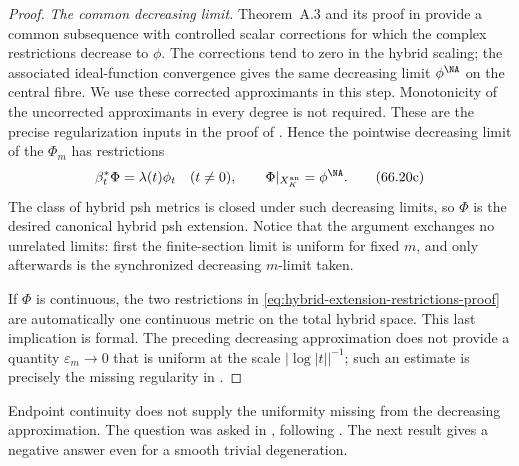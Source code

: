 \begin{proof}
\smallskip
\noindent\emph{The common decreasing limit.}
Theorem~A.3 and its proof in \cite{PS23Hybrid} provide a common subsequence
with controlled scalar corrections for which the complex restrictions
decrease to $\phi$. The corrections tend to zero in the hybrid scaling;
the associated ideal-function convergence gives the same decreasing limit
$\phi^{\NA}$ on the central fibre. We use these corrected approximants in
this step. Monotonicity of the uncorrected approximants in every degree is
not required. These are the precise regularization inputs in the proof of
\cite[Theorem~3.13]{PS23Hybrid}.  Hence the pointwise decreasing limit
of the $\Phi_m$ has restrictions
\[
        \beta_t^*\Phi=\lambda(t)\phi_t\quad(t\neq0),
        \qquad
        \Phi|_{X_K^{\mathrm{an}}}=\phi^{\NA}.
\tag{66.20c}\label{eq:hybrid-extension-restrictions-proof}
\]
The class of hybrid psh metrics is closed under such decreasing limits, so
$\Phi$ is the desired canonical hybrid psh extension.  Notice that the
argument exchanges no unrelated limits: first the finite-section limit is
uniform for fixed $m$, and only afterwards is the synchronized decreasing
$m$-limit taken.

If $\Phi$ is continuous, the two restrictions in
\eqref{eq:hybrid-extension-restrictions-proof} are automatically one
continuous metric on the total hybrid space.  This last implication is
formal.  The preceding decreasing approximation does not provide a
quantity $\varepsilon_m\to0$ that is uniform at the scale
$|\log|t||^{-1}$; such an estimate is precisely the missing regularity
in \cite[Question~3.18]{PS23Hybrid}.
\end{proof}

Endpoint continuity does not supply the uniformity missing from the
decreasing approximation.  The question was asked in
\cite[Question~3.18]{PS23Hybrid}, following
\cite[Question~1]{Favre20Hybrid}.  The next result gives a negative answer
even for a smooth trivial degeneration.

